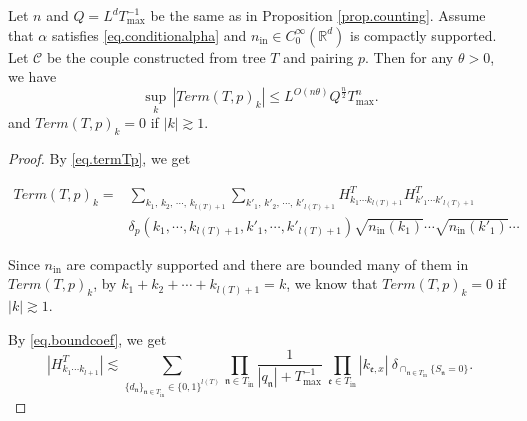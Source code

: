 \begin{lem}\label{lem.Tpvariance} Let $n$ and $Q=L^dT^{-1}_{\text{max}}$ be the same as in Proposition \ref{prop.counting}. Assume that $\alpha$ satisfies \eqref{eq.conditionalpha} and $n_{\mathrm{in}} \in C^\infty_0(\mathbb{R}^d)$ is compactly supported. Let $\mathcal{C}$ be the couple constructed from tree $T$ and pairing $p$. Then for any $\theta>0$, we have
\begin{equation}
    \sup_k\, |Term(T,p)_k|\le L^{O(n\theta)} Q^{\frac{n}{2}} T_{\text{max}}^{n}.
\end{equation}
and $Term(T,p)_k=0$ if $|k|\gtrsim 1$.
\end{lem}
\begin{proof} By \eqref{eq.termTp}, we get

\begin{equation}
\begin{split}
    Term(T, p)_k=&\sum_{k_1,\, k_2,\, \cdots,\, k_{l(T)+1}}\sum_{k'_1,\, k'_2,\, \cdots,\, k'_{l(T)+1}} H^T_{k_1\cdots k_{l(T)+1}} H^{T}_{k'_1\cdots k'_{l(T)+1}}
    \\
    & \delta_{p}(k_1,\cdots, k_{l(T)+1}, k'_1,\cdots, k'_{l(T)+1})\sqrt{n_{\textrm{in}}(k_1)}\cdots\sqrt{n_{\textrm{in}}(k'_1)}\cdots
\end{split}
\end{equation}

Since $n_{\mathrm{in}}$ are compactly supported and there are bounded many of them in $Term(T, p)_k$, by $k_1 + k_2 + \cdots + k_{l(T)+1}=k$, we know that $Term(T, p)_k=0$ if $|k|\gtrsim 1$.

By \eqref{eq.boundcoef}, we get  %
\begin{equation}\label{eq.termlemmaeq1}
    |H^T_{k_1\cdots k_{l+1}}|\lesssim \sum_{\{d_{\mathfrak{n}}\}_{\mathfrak{n}\in T_{\text{in}}}\in\{0,1\}^{l(T)}}\prod_{\mathfrak{n}\in T_{\text{in}}}\frac{1}{|q_{\mathfrak{n}}|+T^{-1}_{\text{max}}}\ \prod_{\mathfrak{e}\in T_{\text{in}}}|k_{\mathfrak{e},x}|\ \delta_{\cap_{\mathfrak{n}\in T_{\text{in}}} \{S_{\mathfrak{n}}=0\}}.
\end{equation}






\end{proof}
